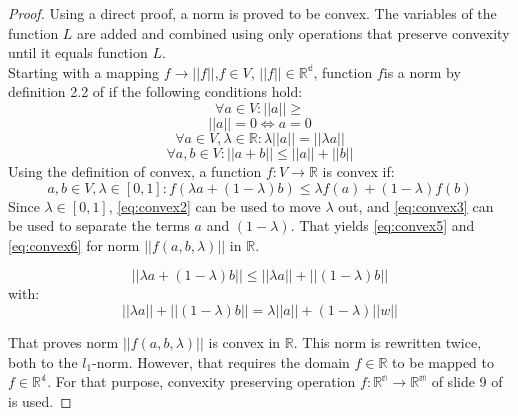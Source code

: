 \begin{proof}
Using a direct proof, a norm is proved to be convex. The variables of the function $L$ are added and combined using only operations that preserve convexity until it equals function $L$. 
\\
Starting with a mapping $f\rightarrow ||f||$,$f\in V$,  $||f|| \in \mathbb{R^d}$, function $f$is a norm by definition 2.2 of \cite{norm_definition} if the following conditions hold:
\begin{equation}
    \forall a \in V:||a||\geq
    \label{eq:convex0}
\end{equation}
\begin{equation}
    ||a||=0 \Leftrightarrow a=0
    \label{eq:convex1}
\end{equation}
\begin{equation}
    \forall a \in V, \lambda \in \mathbb{R}:\lambda||a||=||\lambda a||
    \label{eq:convex2}
\end{equation}
\begin{equation}
    \forall a,b\in V:||a+b||\leq ||a||+||b||
    \label{eq:convex3}
\end{equation}
Using the definition of convex\cite{zinkevich2003online}, a function $f:V\rightarrow \mathbb{R}$ is convex if:
\begin{equation}
    a,b \in V,\lambda \in[0,1]:f(\lambda a+(1-\lambda)b)\leq \lambda f(a)+(1-\lambda)f(b)
    \label{eq:convex4}
\end{equation}
Since $\lambda \in [0,1]$, \cref{eq:convex2} can be used to move $\lambda$ out, and \cref{eq:convex3} can be used to separate the terms $a$ and $(1-\lambda)$. That yields \cref{eq:convex5} and \cref{eq:convex6} for norm $||f(a,b,\lambda)||$ in $\mathbb{R}$.

\begin{equation}
    ||\lambda a+(1-\lambda)b||\leq ||\lambda a||+||(1-\lambda)b||
    \label{eq:convex5}
\end{equation}
with:
\begin{equation}
    ||\lambda a||+||(1-\lambda)b||=\lambda||a||+(1-\lambda)||w||
    \label{eq:convex6}
\end{equation}

That proves norm $||f(a,b,\lambda)||$ is convex in $\mathbb{R}$. This norm is rewritten twice, both to the $l_1$-norm. However, that requires the domain $f \in \mathbb{R}$ to be mapped to $f \in \mathbb{R^4}$. For that purpose, convexity preserving operation $f:\mathbb{R^n}\rightarrow \mathbb{R^m}$ of slide 9 of \cite{preserving_convexity} is used.


\end{proof}
